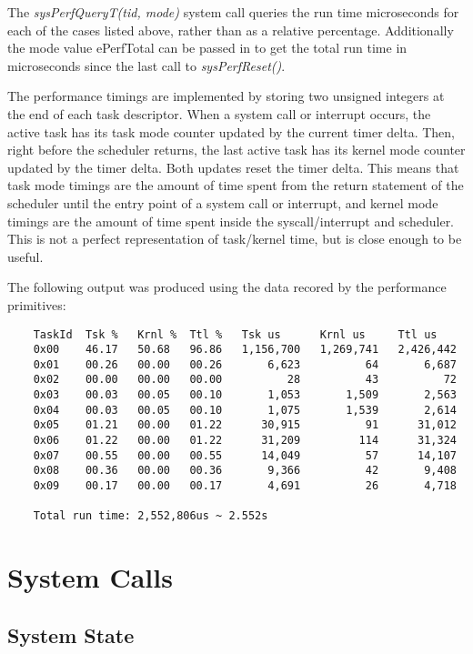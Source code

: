 \documentclass[twoside,a4paper]{refart}
\begin{document}
The \textit{sysPerfQueryT(tid, mode)} system call queries the run time microseconds for each of the cases listed above, rather than as a relative percentage. Additionally the mode value ePerfTotal can be passed in to get the total run time in microseconds since the last call to \textit{sysPerfReset()}.

The performance timings are implemented by storing two unsigned integers at the end of each task descriptor. When a system call or interrupt occurs, the active task has its task mode counter updated by the current timer delta. Then, right before the scheduler returns, the last active task has its kernel mode counter updated by the timer delta. Both updates reset the timer delta. This means that task mode timings are the amount of time spent from the return statement of the scheduler until the entry point of a system call or interrupt, and kernel mode timings are the amount of time spent inside the syscall/interrupt and scheduler. This is not a perfect representation of task/kernel time, but is close enough to be useful.

The following output was produced using the data recored by the performance primitives:
\begin{verbatim}
    TaskId  Tsk %   Krnl %  Ttl %   Tsk us      Krnl us     Ttl us
    0x00    46.17   50.68   96.86   1,156,700   1,269,741   2,426,442
    0x01    00.26   00.00   00.26       6,623          64       6,687
    0x02    00.00   00.00   00.00          28          43          72
    0x03    00.03   00.05   00.10       1,053       1,509       2,563
    0x04    00.03   00.05   00.10       1,075       1,539       2,614
    0x05    01.21   00.00   01.22      30,915          91      31,012
    0x06    01.22   00.00   01.22      31,209         114      31,324
    0x07    00.55   00.00   00.55      14,049          57      14,107
    0x08    00.36   00.00   00.36       9,366          42       9,408
    0x09    00.17   00.00   00.17       4,691          26       4,718

    Total run time: 2,552,806us ~ 2.552s
\end{verbatim}

\section{System Calls}
\subsection{System State}
\end{document}
